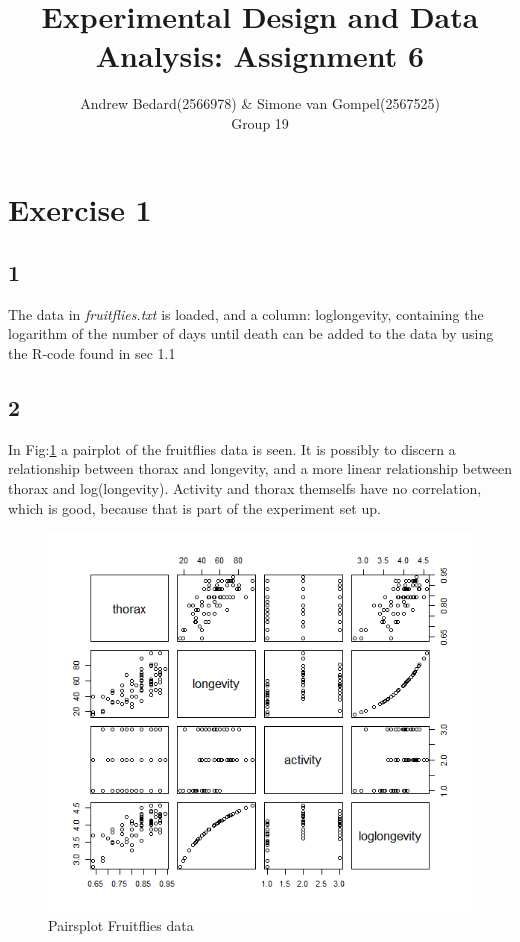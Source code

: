 \documentclass{article}
\title{Experimental Design and Data Analysis: Assignment 6}
\author{Andrew Bedard(2566978) \& Simone van Gompel(2567525) \\ Group 19}
\begin{document}
  \maketitle

  \section*{Exercise 1}
    \subsection*{1}
      The data in \textit{fruitflies.txt} is loaded, and a column: loglongevity, containing the logarithm of the number of days until death can be added to the data by using the R-code found in sec 1.1
      
    \subsection*{2}
      In Fig:\ref{fig:PairFruit} a pairplot of the fruitflies data is seen. It is possibly to discern a relationship between thorax and longevity, and a more linear relationship between thorax and log(longevity).
      Activity and thorax themselfs have no correlation, which is good, because that is part of the experiment set up.
      \begin{figure}[H]
          \centering
          \includegraphics[scale=0.3]{../results/fruitflies2.png}
          \caption{Pairsplot Fruitflies data}
          \label{fig:PairFruit}
      \end{figure}
\end{document}
